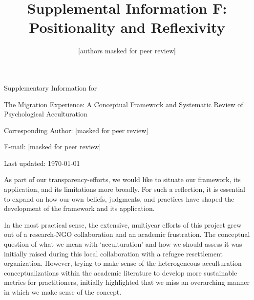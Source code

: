 \documentclass[man, 12pt, a4paper]{apa7}
\title{Supplemental Information F: Positionality and Reflexivity}
\author{[authors masked for peer review]}
\begin{document}
\begin{titlepage}
	{\noindent\Large Supplementary Information for \par}
	\vspace{0.5cm}
	{\noindent\Large The Migration Experience: A Conceptual Framework and Systematic Review of Psychological Acculturation\par}
	\vspace{1.5cm}
	{\noindent\LARGE\bfseries \thetitle \par}
	\vspace{2cm}
	{\noindent\Large\itshape \theauthor \par}
	\vfill
	\noindent Corresponding Author: [masked for peer review]\par
	\noindent E-mail: [masked for peer review]\par
	\vfill

	{\noindent Last updated: \today\par}
\end{titlepage}

\begin{center}
   \textbf{\thetitle} 
\end{center}

As part of our transparency-efforts, we would like to situate our framework, its application, and its limitations more broadly. For such a reflection, it is essential to expand on how our own beliefs, judgments, and practices have shaped the development of the framework and its application. 

In the most practical sense, the extensive, multiyear efforts of this project grew out of a research-NGO collaboration and an academic frustration. The conceptual question of what we mean with `acculturation' and how we should assess it was initially raised during this local collaboration with a refugee resettlement organization. However, trying to make sense of the heterogeneous acculturation conceptualizations within the academic literature to develop more sustainable metrics for practitioners, initially highlighted that we miss an overarching manner in which we make sense of the concept. 
\end{document}
